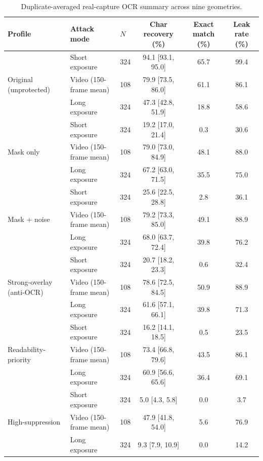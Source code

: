 \documentclass{ieeeaccess}
\begin{document}
\begin{table}[!t]
\caption{Duplicate-averaged real-capture OCR summary across nine geometries.}
\label{tab:real_ocr_full_pool}
\centering
\footnotesize
\begin{tabular}{lllccc}
\toprule
Profile & Attack mode & $N$ & Char recovery (\%) & Exact match (\%) & Leak rate (\%) \\
\midrule
\multirow{3}{*}{Original (unprotected)}
 & Short exposure & 324 & 94.1 [93.1, 95.0] & 65.7 & 99.4 \\
 & Video (150-frame mean) & 108 & 79.9 [73.5, 86.0] & 61.1 & 86.1 \\
 & Long exposure & 324 & 47.3 [42.8, 51.9] & 18.8 & 58.6 \\
\midrule
\multirow{3}{*}{Mask only}
 & Short exposure & 324 & 19.2 [17.0, 21.4] & 0.3 & 30.6 \\
 & Video (150-frame mean) & 108 & 79.0 [73.0, 84.9] & 48.1 & 88.0 \\
 & Long exposure & 324 & 67.2 [63.0, 71.5] & 35.5 & 75.0 \\
\midrule
\multirow{3}{*}{Mask + noise}
 & Short exposure & 324 & 25.6 [22.5, 28.8] & 2.8 & 36.1 \\
 & Video (150-frame mean) & 108 & 79.2 [73.3, 85.0] & 49.1 & 88.9 \\
 & Long exposure & 324 & 68.0 [63.7, 72.4] & 39.8 & 76.2 \\
\midrule
\multirow{3}{*}{Strong-overlay (anti-OCR)}
 & Short exposure & 324 & 20.7 [18.2, 23.3] & 0.6 & 32.4 \\
 & Video (150-frame mean) & 108 & 78.6 [72.5, 84.5] & 50.9 & 88.9 \\
 & Long exposure & 324 & 61.6 [57.1, 66.1] & 39.8 & 71.3 \\
\midrule
\multirow{3}{*}{Readability-priority}
 & Short exposure & 324 & 16.2 [14.1, 18.5] & 0.5 & 23.5 \\
 & Video (150-frame mean) & 108 & 73.4 [66.8, 79.6] & 43.5 & 86.1 \\
 & Long exposure & 324 & 60.9 [56.6, 65.6] & 36.4 & 69.1 \\
\midrule
\multirow{3}{*}{High-suppression}
 & Short exposure & 324 & 5.0 [4.3, 5.8] & 0.0 & 3.7 \\
 & Video (150-frame mean) & 108 & 47.9 [41.8, 54.0] & 5.6 & 76.9 \\
 & Long exposure & 324 & 9.3 [7.9, 10.9] & 0.0 & 14.2 \\
\bottomrule
\end{tabular}
\end{table}
\end{document}
